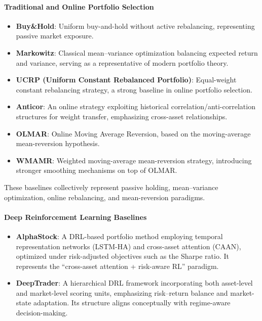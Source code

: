 \documentclass[letterpaper]{article} %
\begin{document}
\paragraph{Traditional and Online Portfolio Selection}

\begin{itemize}
    \item \textbf{Buy\&Hold}: Uniform buy-and-hold without active rebalancing, representing passive market exposure.
    
    \item \textbf{Markowitz}: Classical mean--variance optimization balancing expected return and variance, serving as a representative of modern portfolio theory.
    
    \item \textbf{UCRP (Uniform Constant Rebalanced Portfolio)}: Equal-weight constant rebalancing strategy, a strong baseline in online portfolio selection.
    
    \item \textbf{Anticor}: An online strategy exploiting historical correlation/anti-correlation structures for weight transfer, emphasizing cross-asset relationships.
    
    \item \textbf{OLMAR}: Online Moving Average Reversion, based on the moving-average mean-reversion hypothesis.
    
    \item \textbf{WMAMR}: Weighted moving-average mean-reversion strategy, introducing stronger smoothing mechanisms on top of OLMAR.
\end{itemize}

These baselines collectively represent passive holding, mean--variance optimization, online rebalancing, and mean-reversion paradigms.

\paragraph{Deep Reinforcement Learning Baselines}

\begin{itemize}
    \item \textbf{AlphaStock}: A DRL-based portfolio method employing temporal representation networks (LSTM-HA) and cross-asset attention (CAAN), optimized under risk-adjusted objectives such as the Sharpe ratio. It represents the ``cross-asset attention + risk-aware RL'' paradigm.
    
    \item \textbf{DeepTrader}: A hierarchical DRL framework incorporating both asset-level and market-level scoring units, emphasizing risk--return balance and market-state adaptation. Its structure aligns conceptually with regime-aware decision-making.
\end{itemize}
\end{document}
